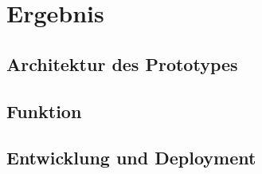 \section{Ergebnis}

\subsection{Architektur des Prototypes}

\subsection{Funktion}

\subsection{Entwicklung und Deployment}
